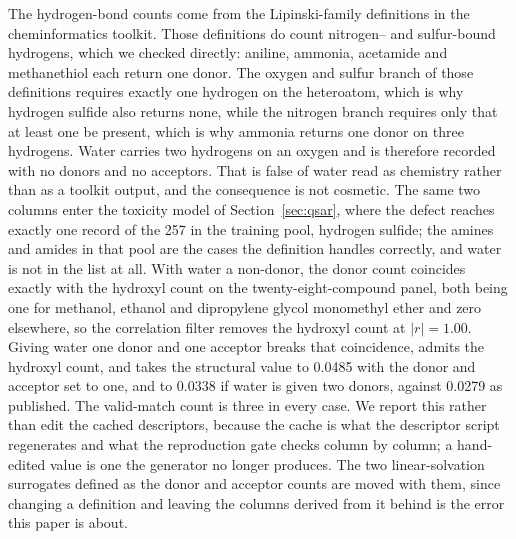 \documentclass[11pt,a4paper]{article}
\begin{document}
The hydrogen-bond counts come from the Lipinski-family definitions in the
cheminformatics toolkit. Those definitions do count nitrogen-- and
sulfur-bound hydrogens, which we checked directly: aniline, ammonia, acetamide
and methanethiol each return one donor. The oxygen and sulfur branch of those definitions requires exactly one hydrogen
on the heteroatom, which is why hydrogen sulfide also returns none, while the
nitrogen branch requires only that at least one be present, which is why
ammonia returns one donor on three hydrogens. Water carries two hydrogens on an
oxygen and is therefore recorded with no donors and no acceptors. That is false of water read as
chemistry rather than as a toolkit output, and the consequence is not
cosmetic. The same two columns enter the toxicity model of
Section~\ref{sec:qsar}, where the defect reaches exactly one record of the 257
in the training pool, hydrogen sulfide; the amines and amides in that pool are
the cases the definition handles correctly, and water is not in the list at
all. With water a non-donor, the donor count coincides exactly with the
hydroxyl count on the twenty-eight-compound panel, both being one for methanol,
ethanol and dipropylene glycol monomethyl ether and zero elsewhere, so the
correlation filter removes the hydroxyl count at $|r| = 1.00$. Giving water one
donor and one acceptor breaks that coincidence, admits the hydroxyl count, and
takes the structural value to 0.0485 with the donor and acceptor set to one, and
to 0.0338 if water is given two donors, against 0.0279 as published. The
valid-match count is three in every case. We report this rather than edit the
cached descriptors, because the cache is what the descriptor script regenerates
and what the reproduction gate checks column by column; a hand-edited value is
one the generator no longer produces. The two linear-solvation surrogates
defined as the donor and acceptor counts are moved with them, since changing a
definition and leaving the columns derived from it behind is the error this paper
is about.
\end{document}
